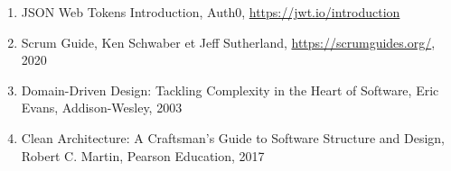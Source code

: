 \begin{enumerate}
    \item JSON Web Tokens Introduction, Auth0, \url{https://jwt.io/introduction}

    \item Scrum Guide, Ken Schwaber et Jeff Sutherland, \url{https://scrumguides.org/}, 2020

    \item Domain-Driven Design: Tackling Complexity in the Heart of Software, Eric Evans, Addison-Wesley, 2003

    \item Clean Architecture: A Craftsman's Guide to Software Structure and Design, Robert C. Martin, Pearson Education, 2017
\end{enumerate}
